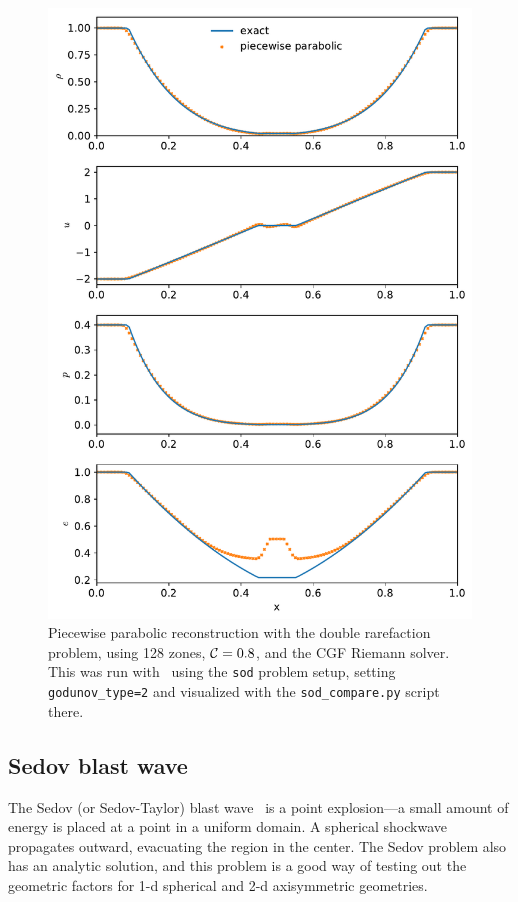 \begin{figure}[t]
\centering
\includegraphics[width=0.7\linewidth]{hydro1d_ppm_double_rare}
\caption[Piecewise constant reconstruction double rarefaction problem]{\label{fig:Euler:doublerare:ppm} Piecewise parabolic
  reconstruction with the double rarefaction problem, using 128 zones,
  ${\mathcal{C}} = 0.8$, and the CGF Riemann solver.  This was run with
  \hydrooned\ using the {\tt sod} problem setup, setting {\tt
    godunov\_type=2} and visualized with the {\tt sod\_compare.py}
  script there.}
\end{figure}


\subsection{Sedov blast wave}

The Sedov (or Sedov-Taylor) blast wave~\cite{sedov:1959} is a point
explosion---a small amount of energy is placed at a point in a uniform
domain.  A spherical shockwave propagates outward, evacuating the
region in the center.  The Sedov problem also has an analytic
solution, and this problem is a good way of testing out the geometric
factors for 1-d spherical and 2-d axisymmetric geometries.


